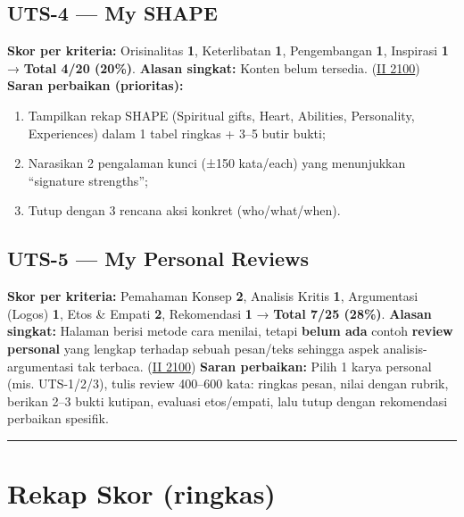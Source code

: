 \documentclass[
  letterpaper,
  DIV=11,
  numbers=noendperiod]{scrreprt}
\providecommand{\tightlist}{%
  \setlength{\itemsep}{0pt}\setlength{\parskip}{0pt}}
\begin{document}
\subsection{UTS-4 --- My SHAPE}\label{uts-4-my-shape}

\textbf{Skor per kriteria:} Orisinalitas \textbf{1}, Keterlibatan
\textbf{1}, Pengembangan \textbf{1}, Inspirasi \textbf{1} →
\textbf{Total 4/20 (20\%)}. \textbf{Alasan singkat:} Konten belum
tersedia.
(\href{https://ii-2100.github.io/all-about-me/My_Shapes/index.html}{II
2100}) \textbf{Saran perbaikan (prioritas):}

\begin{enumerate}
\def\labelenumi{\arabic{enumi}.}
\tightlist
\item
  Tampilkan rekap SHAPE (Spiritual gifts, Heart, Abilities, Personality,
  Experiences) dalam 1 tabel ringkas + 3--5 butir bukti;
\item
  Narasikan 2 pengalaman kunci (±150 kata/each) yang menunjukkan
  ``signature strengths'';
\item
  Tutup dengan 3 rencana aksi konkret (who/what/when).
\end{enumerate}

\subsection{UTS-5 --- My Personal
Reviews}\label{uts-5-my-personal-reviews-1}

\textbf{Skor per kriteria:} Pemahaman Konsep \textbf{2}, Analisis Kritis
\textbf{1}, Argumentasi (Logos) \textbf{1}, Etos \& Empati \textbf{2},
Rekomendasi \textbf{1} → \textbf{Total 7/25 (28\%)}. \textbf{Alasan
singkat:} Halaman berisi metode cara menilai, tetapi \textbf{belum ada}
contoh \textbf{review personal} yang lengkap terhadap sebuah pesan/teks
sehingga aspek analisis-argumentasi tak terbaca.
(\href{https://ii-2100.github.io/all-about-me/My_Personal_Reviews/index.html}{II
2100}) \textbf{Saran perbaikan:} Pilih 1 karya personal (mis.
UTS-1/2/3), tulis review 400--600 kata: ringkas pesan, nilai dengan
rubrik, berikan 2--3 bukti kutipan, evaluasi etos/empati, lalu tutup
dengan rekomendasi perbaikan spesifik.

\begin{center}\rule{0.5\linewidth}{0.5pt}\end{center}

\section{Rekap Skor (ringkas)}\label{rekap-skor-ringkas}
\end{document}
